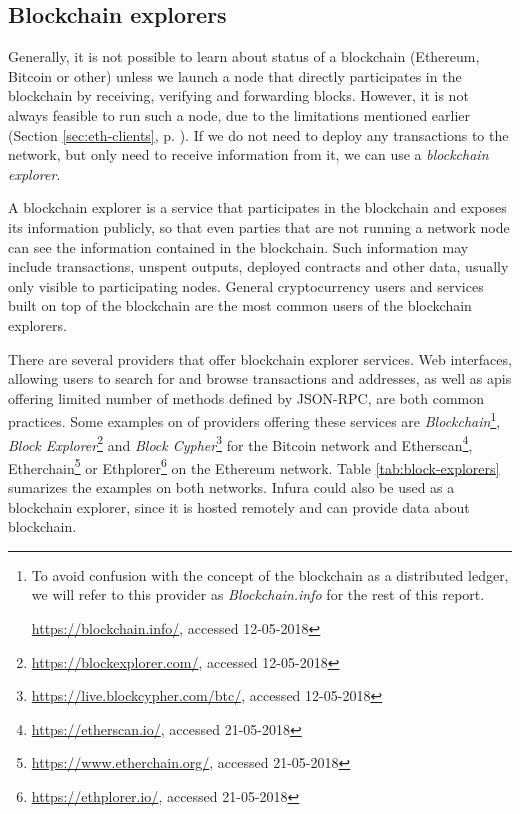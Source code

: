 \subsection{Blockchain explorers}
Generally, it is not possible to learn about status of a blockchain (Ethereum, Bitcoin or other) unless we launch a node that directly participates in the blockchain by receiving, verifying and forwarding blocks. However, it is not always feasible to run such a node, due to the limitations mentioned earlier (Section \ref{sec:eth-clients}, p. \pageref{sec:eth-clients}). If we do not need to deploy any transactions to the network, but only need to receive information from it, we can use a \textit{blockchain explorer}.

A blockchain explorer is a service that participates in the blockchain and exposes its information publicly, so that even parties that are not running a network node can see the information contained in the blockchain\footnotemark. Such information may include transactions, unspent outputs, deployed contracts and other data, usually only visible to participating nodes. 
% 
% 
General cryptocurrency users and services built on top of the blockchain are the most common users of the blockchain explorers\footnotemark.
%

There are several providers that offer blockchain explorer services. Web interfaces, allowing users to search for and browse transactions and addresses, as well as \acrshort{api}s offering limited number of methods defined by JSON-RPC, are both common practices. Some examples on of providers offering these services are \textit{Blockchain}\footnote{To avoid confusion with the concept of the blockchain as a distributed ledger, we will refer to this provider as \textit{Blockchain.info} for the rest of this report.

\url{https://blockchain.info/}, accessed 12-05-2018}, \textit{Block Explorer}\footnote{\url{https://blockexplorer.com/}, accessed 12-05-2018} and \textit{Block Cypher}\footnote{\url{https://live.blockcypher.com/btc/}, accessed 12-05-2018} for the Bitcoin network and Etherscan\footnote{\url{https://etherscan.io/}, accessed 21-05-2018}, Etherchain\footnote{\url{https://www.etherchain.org/}, accessed 21-05-2018}
or Ethplorer\footnote{\url{https://ethplorer.io/}, accessed 21-05-2018} on the Ethereum network. Table \ref{tab:block-explorers} sumarizes the examples on both networks. Infura could also be used as a blockchain explorer, since it is hosted remotely and can provide data about blockchain.

